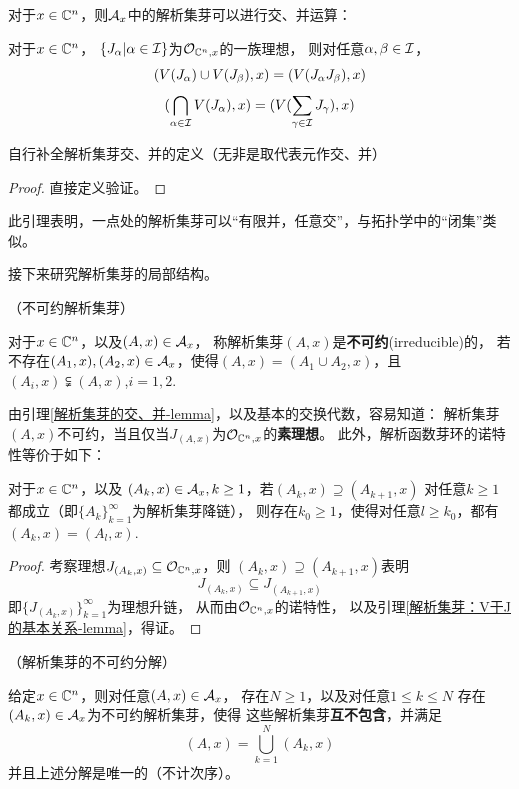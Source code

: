 对于$x\in\mathbb{C}^n$，则$\mathcal{A}_x$中的解析集芽可以进行交、并运算：

\begin{lemma}对于$x\in\mathbb{C}^n$，
$\{J_\alpha|\alpha\in\mathcal{I}\}$为$\mathcal{O}_{\mathbb{C}^n,x}$的一族理想，
则对任意$\alpha,\beta\in\mathcal{I}$，
$$(V(J_\alpha)\cup V(J_\beta),x)=(V(J_\alpha J_\beta),x)$$
$$(\bigcap_{\alpha\in\mathcal{I}}V(J_\alpha),x)
=(V(\sum_{\gamma\in\mathcal{I}}J_\gamma),x)$$
\label{解析集芽的交、并-lemma}
\end{lemma}
自行补全解析集芽交、并的定义（无非是取代表元作交、并）
\begin{proof}
直接定义验证。
\end{proof}
此引理表明，一点处的解析集芽可以“有限并，任意交”，与拓扑学中的“闭集”类似。

接下来研究解析集芽的局部结构。

\begin{definition}（不可约解析集芽）

对于$x\in\mathbb{C}^n$，以及$(A,x)\in\mathcal{A}_x$，
称解析集芽$(A,x)$是\textbf{不可约}(irreducible)的，
若不存在$(A_1,x),(A_2,x)\in\mathcal{A}_x$，使得$(A,x)=(A_1\cup A_2,x)$，且
$(A_i,x)\subsetneqq (A,x)$,$i=1,2$.
\end{definition}

由引理\ref{解析集芽的交、并-lemma}，以及基本的交换代数，容易知道：
解析集芽$(A,x)$不可约，当且仅当$J_{(A,x)}$为$\mathcal{O}_{\mathbb{C}^n,x}$的\textbf{素理想}。
此外，解析函数芽环的诺特性等价于如下：

\begin{lemma}对于$x\in\mathbb{C}^n$，以及
$(A_k,x)\in\mathcal{A}_x,k\geq 1$，若$(A_k,x)\supseteq(A_{k+1},x)$
对任意$k\geq 1$都成立（即$\{A_k\}_{k=1}^\infty$为解析集芽降链），
则存在$k_0\geq 1$，使得对任意$l\geq k_0$，都有$(A_k,x)=(A_l,x)$.
\label{解析集芽-降链性质-lemma}
\end{lemma}

\begin{proof}
考察理想$J_{(A_k,x)}\subseteq\mathcal{O}_{\mathbb{C}^n,x}$，则
$(A_k,x)\supseteq(A_{k+1},x)$表明
$$J_{(A_k,x)}\subseteq J_{(A_{k+1},x)}$$
即$\{J_{(A_k,x)}\}_{k=1}^\infty$为理想升链，
从而由$\mathcal{O}_{\mathbb{C}^n,x}$的诺特性，
以及引理\ref{解析集芽：V于J的基本关系-lemma}，得证。
\end{proof}

\begin{thm}（解析集芽的不可约分解）

给定$x\in\mathbb{C}^n$，则对任意$(A,x)\in\mathcal{A}_x$，
存在$N\geq 1$，以及对任意$1\leq k\leq N$
存在$(A_k,x)\in\mathcal{A}_x$为不可约解析集芽，使得
这些解析集芽\textbf{互不包含}，并满足
$$(A,x)=\bigcup_{k=1}^N(A_k,x)$$
并且上述分解是唯一的（不计次序）。
\end{thm}

